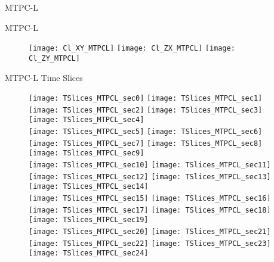 \documentclass[11pt]{beamer}
\begin{document}
\begin{frame}
\centering
\Huge
MTPC-L
\end{frame}

\begin{frame}{MTPC-L}
\begin{figure}
\centering
\texttt{[image: Cl\_XY\_MTPCL]}
\texttt{[image: Cl\_ZX\_MTPCL]}
\texttt{[image: Cl\_ZY\_MTPCL]}
\end{figure}
\end{frame}

\begin{frame}{MTPC-L Time Slices}
\begin{figure}
\centering
\texttt{[image: TSlices\_MTPCL\_sec0]}
\texttt{[image: TSlices\_MTPCL\_sec1]}
\texttt{[image: TSlices\_MTPCL\_sec2]}
\texttt{[image: TSlices\_MTPCL\_sec3]}
\texttt{[image: TSlices\_MTPCL\_sec4]}\\
\texttt{[image: TSlices\_MTPCL\_sec5]}
\texttt{[image: TSlices\_MTPCL\_sec6]}
\texttt{[image: TSlices\_MTPCL\_sec7]}
\texttt{[image: TSlices\_MTPCL\_sec8]}
\texttt{[image: TSlices\_MTPCL\_sec9]}\\
\texttt{[image: TSlices\_MTPCL\_sec10]}
\texttt{[image: TSlices\_MTPCL\_sec11]}
\texttt{[image: TSlices\_MTPCL\_sec12]}
\texttt{[image: TSlices\_MTPCL\_sec13]}
\texttt{[image: TSlices\_MTPCL\_sec14]}\\
\texttt{[image: TSlices\_MTPCL\_sec15]}
\texttt{[image: TSlices\_MTPCL\_sec16]}
\texttt{[image: TSlices\_MTPCL\_sec17]}
\texttt{[image: TSlices\_MTPCL\_sec18]}
\texttt{[image: TSlices\_MTPCL\_sec19]}\\
\texttt{[image: TSlices\_MTPCL\_sec20]}
\texttt{[image: TSlices\_MTPCL\_sec21]}
\texttt{[image: TSlices\_MTPCL\_sec22]}
\texttt{[image: TSlices\_MTPCL\_sec23]}
\texttt{[image: TSlices\_MTPCL\_sec24]}
\end{figure}
\end{frame}
\end{document}
